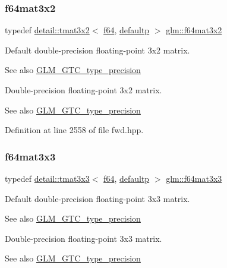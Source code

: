 \subsubsection{\texorpdfstring{f64mat3x2}{f64mat3x2}}
{\footnotesize\ttfamily typedef \hyperlink{structglm_1_1detail_1_1tmat3x2}{detail\+::tmat3x2}$<$ \hyperlink{group__gtc__type__precision_ga2bba392e555124b36cde6abba349bab3}{f64}, \hyperlink{namespaceglm_a0f04f086094c747d227af4425893f545a9d21ccd8b5a009ec7eb7677befc3bf51}{defaultp} $>$ \hyperlink{group__gtc__type__precision_gae6388c7664b5bb281047a9fd7984f97b}{glm\+::f64mat3x2}}

Default double-\/precision floating-\/point 3x2 matrix. \begin{DoxySeeAlso}{See also}
\hyperlink{group__gtc__type__precision}{G\+L\+M\+\_\+\+G\+T\+C\+\_\+type\+\_\+precision}
\end{DoxySeeAlso}
Double-\/precision floating-\/point 3x2 matrix. \begin{DoxySeeAlso}{See also}
\hyperlink{group__gtc__type__precision}{G\+L\+M\+\_\+\+G\+T\+C\+\_\+type\+\_\+precision} 
\end{DoxySeeAlso}


Definition at line 2558 of file fwd.\+hpp.

\mbox{\label{group__gtc__type__precision_gad74db0197015b8d1d77ce54cf8d0ae60}} 
\subsubsection{\texorpdfstring{f64mat3x3}{f64mat3x3}}
{\footnotesize\ttfamily typedef \hyperlink{structglm_1_1detail_1_1tmat3x3}{detail\+::tmat3x3}$<$ \hyperlink{group__gtc__type__precision_ga2bba392e555124b36cde6abba349bab3}{f64}, \hyperlink{namespaceglm_a0f04f086094c747d227af4425893f545a9d21ccd8b5a009ec7eb7677befc3bf51}{defaultp} $>$ \hyperlink{group__gtc__type__precision_gad74db0197015b8d1d77ce54cf8d0ae60}{glm\+::f64mat3x3}}

Default double-\/precision floating-\/point 3x3 matrix. \begin{DoxySeeAlso}{See also}
\hyperlink{group__gtc__type__precision}{G\+L\+M\+\_\+\+G\+T\+C\+\_\+type\+\_\+precision}
\end{DoxySeeAlso}
Double-\/precision floating-\/point 3x3 matrix. \begin{DoxySeeAlso}{See also}
\hyperlink{group__gtc__type__precision}{G\+L\+M\+\_\+\+G\+T\+C\+\_\+type\+\_\+precision} 
\end{DoxySeeAlso}


